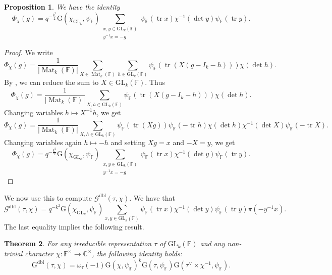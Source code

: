 \documentclass[12pt, reqno]{amsart}
\newtheorem{theorem}{Theorem}[section]
\newtheorem{proposition}[theorem]{Proposition}
\theoremstyle{definition}
\theoremstyle{definition}
\theoremstyle{definition}
\newcommand{\cComplex}{\mathbb{C}}
\newcommand{\multiplicativegroup}[1]{#1^{\times}}
\newcommand{\sizeof}[1]{\left|#1\right|}
\newcommand{\fieldCharacter}{\psi}
\newcommand{\centralCharacter}[1]{\omega_{#1}}
\newcommand{\IdentityMatrix}[1]{I_{#1}}
\newcommand{\trace}{\operatorname{tr}}
\newcommand{\GL}{\mathrm{GL}}
\newcommand{\finiteField}{\mathbb{F}}
\newcommand{\squareMatrix}{\operatorname{Mat}}
\newcommand{\dblGaussSum}[2]{\mathcal{G}^{\mathrm{dbl}}\left(#1, #2\right)}
\newcommand{\GaussSumScalar}[2]{\mathrm{G}\left(#1, #2\right)}
\newcommand{\dblGaussSumScalar}[2]{\mathrm{G}^{\mathrm{dbl}}\left(#1, #2\right)}
\begin{document}
\begin{proposition}\label{prop:doubling-for-gln-in-terms-of-kondo}
	We have the identity
	$$\Phi_{\chi}\left(g\right) = q^{-\frac{k^2}{2}} \GaussSumScalar{\chi_{\GL_k}}{\fieldCharacter_{\finiteField}} \sum_{\substack{x, y \in \GL_k\left(\finiteField\right)\\
			y^{-1} x = -g}} \fieldCharacter_{\finiteField}\left(\trace x\right) \chi^{-1}\left(\det y\right) \fieldCharacter_{\finiteField}\left(\trace y\right).$$
\end{proposition}
\begin{proof}
	We write $$\Phi_{\chi}\left(g\right) = \frac{1}{\sizeof{\squareMatrix_k\left(\finiteField\right)}}\sum_{X \in \squareMatrix_k\left(\finiteField\right)} \sum_{h \in \GL_k\left(\finiteField\right)} \fieldCharacter_{\finiteField}\left(\trace \left(X\left(g-\IdentityMatrix{k}-h\right)\right)\right) \chi\left(\det h\right).$$
	By , we can reduce the sum to $X \in \GL_k\left(\finiteField\right)$. Thus	$$\Phi_{\chi}\left(g\right) = \frac{1}{\sizeof{\squareMatrix_k\left(\finiteField\right)}} \sum_{X, h \in \GL_k\left(\finiteField\right)} \fieldCharacter_{\finiteField}\left(\trace \left(X\left(g-\IdentityMatrix{k}-h\right)\right)\right) \chi\left(\det h\right).$$
	Changing variables $h \mapsto X^{-1} h$, we get
	$$\Phi_{\chi}\left(g\right) = \frac{1}{\sizeof{\squareMatrix_k\left(\finiteField\right)}} \sum_{X, h \in \GL_k\left(\finiteField\right)} \fieldCharacter_{\finiteField}\left(\trace \left(Xg\right)\right) \fieldCharacter_{\finiteField}\left(-\trace h\right) \chi\left(\det h\right) \chi^{-1}\left(\det X\right) \fieldCharacter_{\finiteField}\left(-\trace X\right).$$
	Changing variables again $h \mapsto -h$ and setting $Xg = x$ and $-X = y$, we get  
	$$\Phi_{\chi}\left(g\right) = q^{-\frac{k^2}{2}} \GaussSumScalar{\chi_{\GL_k}}{\fieldCharacter_{\finiteField}} \sum_{\substack{x, y \in \GL_k\left(\finiteField\right)\\
			y^{-1} x = -g}} \fieldCharacter_{\finiteField}\left(\trace x\right) \chi^{-1}\left(\det y\right) \fieldCharacter_{\finiteField}\left(\trace y\right).$$
\end{proof}

We now use this to compute $\dblGaussSum{\tau}{\chi}$. We have that $$\dblGaussSum{\tau}{\chi} = q^{-k^2} \GaussSumScalar{\chi_{\GL_k}}{\fieldCharacter_{\finiteField}} \sum_{x, y \in \GL_k\left(\finiteField\right)} \fieldCharacter_{\finiteField}\left(\trace x\right) \chi^{-1}\left(\det y\right) \fieldCharacter_{\finiteField}\left(\trace y\right) \pi\left(-y^{-1} x\right).$$
The last equality implies the following result.
\begin{theorem}\label{thm:gln-doubling-gauss-sum-in-terms-of-kondo}For any irreducible representation $\tau$ of $\GL_k\left(\finiteField\right)$ and any non-trivial character $\chi \colon \multiplicativegroup{\finiteField} \to \multiplicativegroup{\cComplex}$, the following identity holds:
	$$\dblGaussSumScalar{\tau}{\chi} = \centralCharacter{\tau}\left(-1\right) \GaussSumScalar{\chi}{\fieldCharacter_{\finiteField}}^k \GaussSumScalar{\tau}{\fieldCharacter_{\finiteField}} \GaussSumScalar{\tau^{\vee} \times \chi^{-1}}{\fieldCharacter_{\finiteField}}.$$
\end{theorem}
\end{document}
